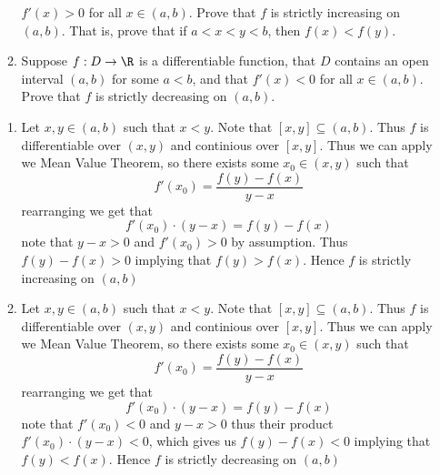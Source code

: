 \documentclass[11pt]{exam}
\begin{document}
\begin{enumerate}
\begin{enumerate}
                $f'(x) > 0$ for all $x \in (a, b)$. Prove that $f$ is strictly increasing on $(a, b)$. That is, prove that if $a < x < y < b$, 
                then $f(x) < f(y)$.
                \item Suppose $f: D \to \R$ is a differentiable function, that $D$ contains an open interval $(a, b)$ for some $a < b$, and that 
                $f'(x) < 0$ for all $x \in (a, b)$. Prove that $f$ is strictly decreasing on $(a, b)$. 
            \end{enumerate}
                \begin{solution}
                    \begin{enumerate}
                        \item Let $x, y \in (a,b)$ such that $x < y$. Note that $[x, y] \subseteq (a, b)$. Thus $f$ is differentiable over $(x, 
                        y)$ and continious over $[x, y]$. Thus we can apply we Mean Value Theorem, so there exists some $x_0 \in (x, y)$ such 
                        that 
                        $$f'(x_0) = \frac{f(y) - f(x)}{y - x}$$ rearranging we get that $$f'(x_0) \cdot (y - x) = f(y) - f(x)$$ note that $y - x 
                        > 0$ and $f'(x_0) > 0$ by assumption. Thus $f(y) - f(x) > 0$ implying that $f(y) > f(x)$. 
                        Hence $f$ is strictly increasing on $(a, b)$
                        \item Let $x, y \in (a, b)$ such that $x < y$. Note that $[x, y] \subseteq (a, b)$. Thus $f$ is differentiable over $(x, 
                        y)$ and continious over $[x, y]$. Thus we can apply we Mean Value Theorem, so there exists some $x_0 \in (x, y)$ such 
                        that $$f'(x_0) = \frac{f(y) - f(x)}{y - x}$$ rearranging we get that $$f'(x_0) \cdot (y - x) = f(y) - f(x)$$ note that 
                        $f'(x_0) < 0$ and $y - x > 0$ thus their product $f'(x_0) \cdot (y - x) < 0$, which gives us $f(y) - f(x) < 0$ implying that $f(y) < f(x)$. Hence $f$ is strictly decreasing on $(a, b)$
                    \end{enumerate}
                \end{solution}
    \end{enumerate}
\end{document}
